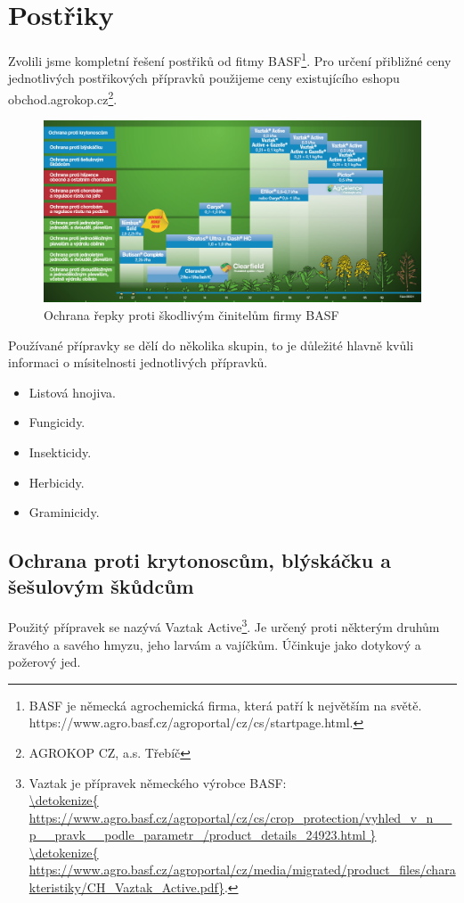 
\section{Postřiky}
Zvolili jsme kompletní řešení postřiků od fitmy BASF\footnote{BASF je německá agrochemická firma, která patří k 
největším na světě.\\https://www.agro.basf.cz/agroportal/cz/cs/startpage.html.}.
Pro určení přibližné ceny jednotlivých postřikových přípravků použijeme ceny existujícího eshopu obchod.agrokop.cz\footnote{AGROKOP CZ, a.s. Třebíč}.
\begin{figure}[ht!]
\centering
\includegraphics[width=170mm]{img/postriky}
\caption{Ochrana řepky proti škodlivým činitelům firmy BASF \label{basf_postriky}}
\end{figure}
Používané přípravky se dělí do několika skupin, to je důležité hlavně kvůli informaci o mísitelnosti jednotlivých přípravků.
\begin{itemize}
  \item Listová hnojiva.
  \item Fungicidy.
  \item Insekticidy.
  \item Herbicidy.
  \item Graminicidy.
\end{itemize}

\subsection{Ochrana proti krytonoscům, blýskáčku a šešulovým škůdcům}
Použitý přípravek se nazývá Vaztak Active\footnote{Vaztak je přípravek německého výrobce BASF: \\\url{\detokenize{
https://www.agro.basf.cz/agroportal/cz/cs/crop_protection/vyhled_v_n__p__pravk__podle_parametr_/product_details_24923.html
}}
\\\url{\detokenize{
https://www.agro.basf.cz/agroportal/cz/media/migrated/product_files/charakteristiky/CH_Vaztak_Active.pdf}}.}.
Je určený proti 
některým  druhům  žravého  a  savého  hmyzu,  jeho  larvám  a  vajíčkům.  Účinkuje  
jako dotykový a požerový jed.


